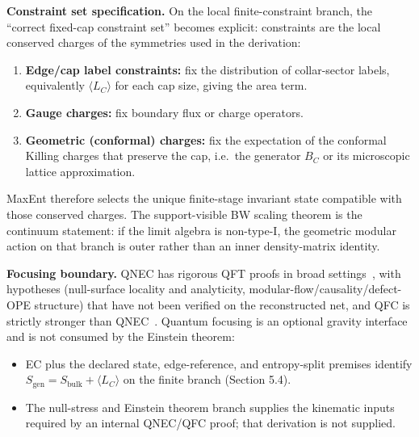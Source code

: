\textbf{Constraint set specification.} On the local finite-constraint branch, the ``correct fixed-cap constraint set'' becomes explicit: constraints are the local conserved charges of the symmetries used in the derivation:
\begin{enumerate}
\def\labelenumi{\arabic{enumi}.}
\item
\textbf{Edge/cap label constraints:} fix the distribution of collar-sector labels, equivalently \(\langle L_C\rangle\) for each cap size, giving the area term.
\item
\textbf{Gauge charges:} fix boundary flux or charge operators.
\item
\textbf{Geometric (conformal) charges:} fix the expectation of the conformal Killing charges that preserve the cap, i.e.\ the generator \(B_C\) or its microscopic lattice approximation.
\end{enumerate}

MaxEnt therefore selects the unique finite-stage invariant state compatible with those conserved charges. The support-visible BW scaling theorem is the continuum statement: if the limit algebra is non-type-I, the geometric modular action on that branch is outer rather than an inner density-matrix identity.

\textbf{Focusing boundary.} QNEC has rigorous QFT proofs in broad settings~\cite{bousso16,balakrishnan19}, with hypotheses (null-surface locality and analyticity, modular-flow/causality/defect-OPE structure) that have not been verified on the reconstructed net, and QFC is strictly stronger than QNEC~\cite{bousso15qfc}. Quantum focusing is an optional gravity interface and is not consumed by the Einstein theorem:
\begin{itemize}
\item
EC plus the declared state, edge-reference, and entropy-split premises identify \(S_{\mathrm{gen}}=S_{\mathrm{bulk}}+\langle L_C\rangle\) on the finite branch (Section 5.4).
\item
The null-stress and Einstein theorem branch supplies the kinematic inputs required by an internal QNEC/QFC proof; that derivation is not supplied.
\end{itemize}

